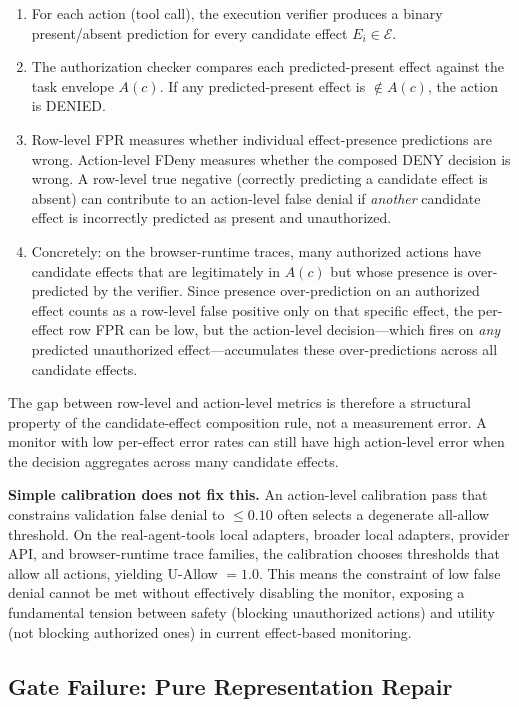 \documentclass{article}
\begin{document}
\begin{enumerate}
    \item For each action (tool call), the execution verifier produces a binary present/absent prediction for every candidate effect $E_i \in \mathcal{E}$.
    \item The authorization checker compares each predicted-present effect against the task envelope $A(c)$. If any predicted-present effect is $\notin A(c)$, the action is DENIED.
    \item Row-level FPR measures whether individual effect-presence predictions are wrong. Action-level FDeny measures whether the composed DENY decision is wrong. A row-level true negative (correctly predicting a candidate effect is absent) can contribute to an action-level false denial if \emph{another} candidate effect is incorrectly predicted as present and unauthorized.
    \item Concretely: on the browser-runtime traces, many authorized actions have candidate effects that are legitimately in $A(c)$ but whose presence is over-predicted by the verifier. Since presence over-prediction on an authorized effect counts as a row-level false positive only on that specific effect, the per-effect row FPR can be low, but the action-level decision---which fires on \emph{any} predicted unauthorized effect---accumulates these over-predictions across all candidate effects.
\end{enumerate}

The gap between row-level and action-level metrics is therefore a structural property of the candidate-effect composition rule, not a measurement error. A monitor with low per-effect error rates can still have high action-level error when the decision aggregates across many candidate effects.

\textbf{Simple calibration does not fix this.} An action-level calibration pass that constrains validation false denial to $\leq 0.10$ often selects a degenerate all-allow threshold. On the real-agent-tools local adapters, broader local adapters, provider API, and browser-runtime trace families, the calibration chooses thresholds that allow all actions, yielding U-Allow $=1.0$. This means the constraint of low false denial cannot be met without effectively disabling the monitor, exposing a fundamental tension between safety (blocking unauthorized actions) and utility (not blocking authorized ones) in current effect-based monitoring.

\subsection{Gate Failure: Pure Representation Repair}
\end{document}
